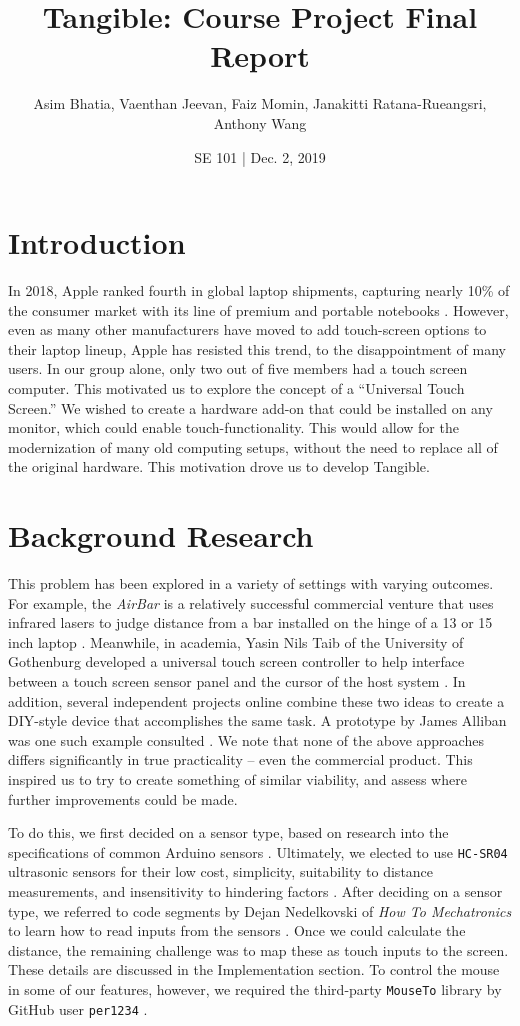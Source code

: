 \documentclass{article}
\title{\textbf{Tangible: Course Project Final Report}}
\date{SE 101 | Dec. 2, 2019}
\author{Asim Bhatia, Vaenthan Jeevan, Faiz Momin, Janakitti Ratana-Rueangsri, Anthony Wang}
\begin{document}
\maketitle

\section{Introduction}
In 2018, Apple ranked fourth in global laptop shipments, capturing nearly 10\% of the consumer market with its line of premium and portable notebooks \cite{1}. However, even as many other manufacturers have moved to add touch-screen options to their laptop lineup, Apple has resisted this trend, to the disappointment of many users. In our group alone, only two out of five members had a touch screen computer. This motivated us to explore the concept of a “Universal Touch Screen.” We wished to create a hardware add-on that could be installed on any monitor, which could enable touch-functionality. This would allow for the modernization of many old computing setups, without the need to replace all of the original hardware. This motivation drove us to develop Tangible.

\section{Background Research}
This problem has been explored in a variety of settings with varying outcomes. For example, the \textit{AirBar} is a relatively successful commercial venture that uses infrared lasers to judge distance from a bar installed on the hinge of a 13 or 15 inch laptop \cite{2}. Meanwhile, in academia, Yasin Nils Taib of the University of Gothenburg developed a universal touch screen controller to help interface between a touch screen sensor panel and the cursor of the host system \cite{3}. In addition, several independent projects online combine these two ideas to create a DIY-style device that accomplishes the same task. A prototype by James Alliban was one such example consulted \cite{4}. We note that none of the above approaches differs significantly in true practicality -- even the commercial product. This inspired us to try to create something of similar viability, and assess where further improvements could be made.

To do this, we first decided on a sensor type, based on research into the specifications of common Arduino sensors \cite{5,6}. Ultimately, we elected to use \verb+HC-SR04+ ultrasonic sensors for their low cost, simplicity, suitability to distance measurements, and insensitivity to hindering factors \cite{7}. After deciding on a sensor type, we referred to code segments by Dejan Nedelkovski of \textit{How To Mechatronics} to learn how to read inputs from the sensors \cite{8}. Once we could calculate the distance, the remaining challenge was to map these as touch inputs to the screen. These details are discussed in the Implementation section. To control the mouse in some of our features, however, we required the third-party \verb-MouseTo- library by GitHub user \verb-per1234- \cite{9}.
\end{document}

